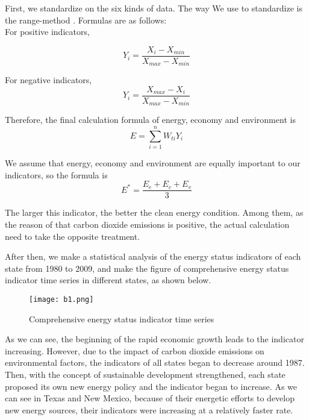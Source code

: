 \documentclass{mcmthesis}
\begin{document}
First, we standardize on the six kinds of data. The way We use to standardize is the range-method . Formulas are as follows:\\

For positive indicators,

\begin{equation}
  Y_i = \frac{X_i - X_{min}}{X_{max} - X_{min}}
\end{equation}

For negative indicators,
\begin{equation}
  Y_i = \frac{X_{max} - X_i}{X_{max} - X_{min}}
\end{equation}

Therefore, the final calculation formula of energy, economy and environment is 
\begin{equation}
  E = \sum_{i=1}^{n} W_{ti} Y_{i} 
\end{equation}

We assume that energy, economy and environment are equally important to our indicators, so the formula is
\begin{equation}
  E^{*} = \frac{E_e + E_c + E_v}{3}
\end{equation}

The larger this indicator, the better the clean energy condition. Among them, as the reason of that carbon dioxide emissions is positive, the actual calculation need to take the opposite treatment.

After then, we make a statistical analysis of the energy status indicators of each state from 1980 to 2009, and make the figure of comprehensive energy status indicator time series in different states, as shown below.
\begin{figure}[htb]
  \centering
  \texttt{[image: b1.png]}
  \caption{Comprehensive energy status indicator time series} \label{fig: Comprehensive energy status indicator time series}
\end{figure}

As we can see, the beginning of the rapid economic growth leads to the indicator increasing. However, due to the impact of carbon dioxide emissions on  environmental factors, the indicators of all states began to decrease around 1987. Then, with the concept of sustainable development strengthened, each state proposed its own new energy policy and the indicator began to increase. As we can see in Texas and New Mexico, because of their energetic efforts to develop new energy sources, their indicators were increasing at a relatively faster rate.
\end{document}
